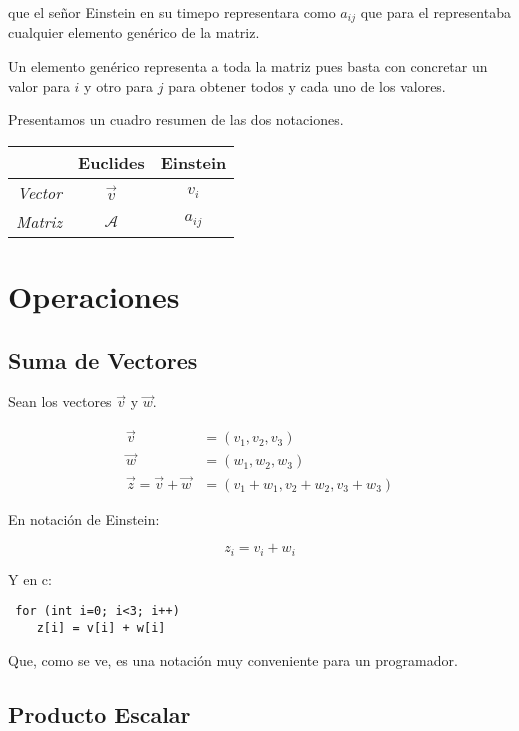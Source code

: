 que el señor Einstein en su timepo representara como $a_{ij}$
que para el representaba cualquier elemento genérico de la matriz.

Un elemento genérico representa a toda la matriz pues basta con concretar
un valor para $i$ y otro para $j$ para obtener todos y cada uno de los valores.

Presentamos un cuadro resumen de las dos notaciones.

\begin{table}[h]
\centering
\begin{tabular}{r|cc}
         & Euclides        & Einstein \\ \hline
  \emph{Vector} & $ \vec{v}     $ & $ v_i $  \\
  \emph{Matriz} & $ \mathcal{A} $ & $ a_{ij} $
\end{tabular}
\end{table}

\section*{Operaciones}

\subsection*{Suma de Vectores}

Sean los vectores $ \vec{v} $ y $ \vec{w} $.

$$
\begin{align*}
\vec{v} &= (v_1, v_2, v_3) \\
\vec{w} &= (w_1, w_2, w_3) \\
\vec{z} = \vec{v} + \vec{w} &= (v_1+w_1, v_2+w_2, v_3+w_3) 
\end{align*}
$$

En notación de Einstein:

$$ z_i = v_i + w_i $$

Y en c:

\begin{lstlisting}
 for (int i=0; i<3; i++)
    z[i] = v[i] + w[i]
\end{lstlisting}


Que, como se ve, es una notación muy conveniente para un programador.



\subsection*{Producto Escalar}

